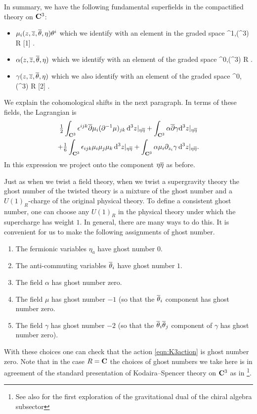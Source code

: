 \documentclass[../main.tex]{subfiles}
\begin{document}
In summary, we have the following fundamental superfields in the compactified theory on $\mathbf{C}^3$:
\begin{itemize}
\item $\mu_i (z,{\overline{z}},\overline{\theta}, \eta) \theta^i$ which we identify with an element in the graded space
\beqn
\mu \in \PV^{1,\bu}(\C^3) \otimes R [1] .
\eeqn
\item $\alpha (z,{\overline{z}},\overline \theta, \eta)$ which we identify with an element of the graded space
\beqn
\alpha \in \Omega^{0,\bu}(\C^3) \otimes R .
\eeqn
\item $\gamma(z,{\overline{z}},\overline \theta, \eta)$ which we also identify with an element of the graded space
\beqn
\gamma \in \Omega^{0,\bu}(\C^3) \otimes R [2] .
\eeqn
\end{itemize}
We explain the cohomological shifts in the next paragraph.
In terms of these fields, the Lagrangian is
\begin{multline}\label{eqn:K3action}
	\tfrac{1}{2}\int_{\mathbf{C}^{3}}   {\epsilon}^{ijk} \overline{\partial} \mu_{i} (\partial^{-1}  \mu)_{jk} \, \mathrm{d}^3 z |_{\eta \overline \eta}   + \int_{\mathbf{C}^{3}}  \alpha \overline{\partial} \gamma \mathrm{d}^3 z  |_{\eta \overline{\eta}} 
	\\
	+ \tfrac{1}{6} \int_{\mathbf{C}^{3}}  {\epsilon}_{ijk} \mu_{i}\mu_{j} \mu_{k} \, \mathrm{d}^3 z |_{\eta \overline{\eta}} + \int_{\mathbf{C}^{3}}  \alpha \mu_i \partial_{z_i}  \gamma \, \mathrm{d}^3 z|_{\eta \overline{\eta}} .
\end{multline} 
In this expression we project onto the component $\eta \overline \eta$ as before.

Just as when we twist a field theory, when we twist a supergravity theory the ghost number of the twisted theory  is a mixture of the ghost number and a $U(1)_R$-charge of the original physical theory. To define a consistent ghost number, one can choose any $U(1)_R$ in the physical theory under which the supercharge has weight $1$.  In general, there are many ways to do this.  It is convenient for us to make the following assignments of ghost number.
\begin{enumerate} 
	\item The fermionic variables $\eta_a$ have ghost number $0$.
	\item The anti-commuting variables $\overline{\theta}_i$ have ghost number $1$.
	\item The field $\alpha$ has ghost number zero.
	\item The field $\mu$ has ghost number $-1$ (so that the $\overline \theta_i$ component has ghost number zero.
	\item The field $\gamma$ has ghost number $-2$ (so that the $\overline \theta_i \overline \theta_j$ component of $\gamma$ has ghost number zero).
\end{enumerate}
With these choices one can check that the action \eqref{eqn:K3action} is ghost number zero.
Note that in the case $R = \mathbf{C}$ the choices of ghost numbers we take here is in agreement of the standard presentation of Kodaira--Spencer theory on $\mathbf{C}^3$ as in \cite{CostelloGaiotto}\footnote{See also \cite{Bonetti:2016nma} for the first exploration of the gravitational dual of the chiral algebra subsector}.
\end{document}
